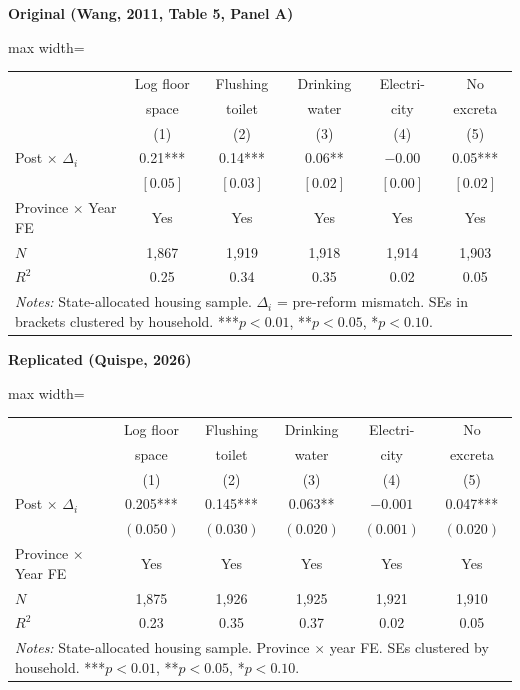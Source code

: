 \documentclass[11pt,a4paper]{article}
\begin{document}
\vspace{0.5cm}
\begin{minipage}[t]{0.48\textwidth}
\centering
\textbf{\large Original (Wang, 2011, Table 5, Panel A)}
\vspace{0.3cm}

\begin{adjustbox}{max width=\textwidth}
\begin{tabular}{lccccc}
\toprule
 & Log floor & Flushing & Drinking & Electri- & No \\
 & space & toilet & water & city & excreta \\
 & (1) & (2) & (3) & (4) & (5) \\
\midrule
Post $\times$ $\Delta_i$ & 0.21*** & 0.14*** & 0.06** & $-0.00$ & 0.05*** \\
 & $[0.05]$ & $[0.03]$ & $[0.02]$ & $[0.00]$ & $[0.02]$ \\[0.3em]
\midrule
Province $\times$ Year FE & Yes & Yes & Yes & Yes & Yes \\
$N$ & 1,867 & 1,919 & 1,918 & 1,914 & 1,903 \\
$R^2$ & 0.25 & 0.34 & 0.35 & 0.02 & 0.05 \\
\bottomrule
\multicolumn{6}{p{0.95\textwidth}}{\footnotesize\textit{Notes:} State-allocated housing sample. $\Delta_i$ = pre-reform mismatch. SEs in brackets clustered by household. ***$p<0.01$, **$p<0.05$, *$p<0.10$.}
\end{tabular}
\end{adjustbox}
\end{minipage}%
\hfill
\begin{minipage}[t]{0.48\textwidth}
\centering
\textbf{\large Replicated (Quispe, 2026)}
\vspace{0.3cm}

\begin{adjustbox}{max width=\textwidth}
\begin{tabular}{lccccc}
\toprule
 & Log floor & Flushing & Drinking & Electri- & No \\
 & space & toilet & water & city & excreta \\
 & (1) & (2) & (3) & (4) & (5) \\
\midrule
Post $\times$ $\Delta_i$ & 0.205*** & 0.145*** & 0.063** & $-0.001$ & 0.047*** \\
 & $(0.050)$ & $(0.030)$ & $(0.020)$ & $(0.001)$ & $(0.020)$ \\[0.3em]
\midrule
Province $\times$ Year FE & Yes & Yes & Yes & Yes & Yes \\
$N$ & 1,875 & 1,926 & 1,925 & 1,921 & 1,910 \\
$R^2$ & 0.23 & 0.35 & 0.37 & 0.02 & 0.05 \\
\bottomrule
\multicolumn{6}{p{0.95\textwidth}}{\footnotesize\textit{Notes:} State-allocated housing sample. Province $\times$ year FE. SEs clustered by household. ***$p<0.01$, **$p<0.05$, *$p<0.10$.}
\end{tabular}
\end{adjustbox}
\end{minipage}
\end{document}
